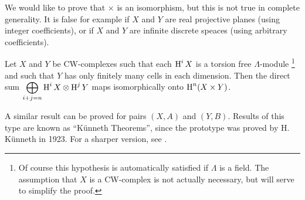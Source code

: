 \documentclass[../main]{subfiles}
\begin{document}
We would like to prove that $\times$ is an isomorphism, but this is not true in complete generality. It is false for example if $X$ and $Y$ are real projective planes (using integer coefficients), or if $X$ and $Y$ are infinite discrete speaces (using arbitrary coefficients).
\begin{theorem}\label{thm:A.6}
Let $X$ and $Y$ be CW-complexes such that each $\operatorname{H}^i X$ is a torsion free $\Lambda$-module \footnote{Of course this hypothesis is automatically satisfied if $\Lambda$ is a field. The assumption that $X$ is a CW-complex is not actually necessary, but will serve to simplify the proof.} and such that $Y$ has only finitely many cells in each dimension. Then the direct sum $\displaystyle\bigoplus_{i+j=n} \operatorname{H}^i X \otimes \operatorname{H}^j Y$ maps isomorphically onto $\operatorname{H}^n (X\times Y)$.
\end{theorem}
A similar result can be proved for pairs $(X, A)$ and $(Y, B)$. Results of this type are known as ``Künneth Theorems'', since the prototype was proved by H. Künneth in 1923. For a sharper version, see \cite[p. 247]{spanier1981}.
\end{document}
